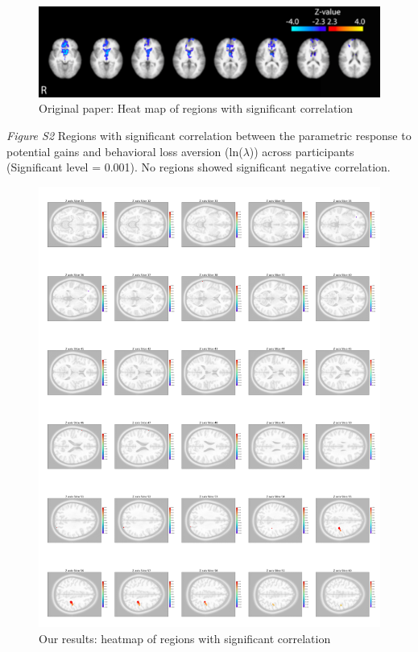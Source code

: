 \documentclass[11pt]{article}
\begin{document}
\begin{figure}[H]
    \centering
        \includegraphics[scale=0.5]{figures/Regression3/Orig_sig_cor_z_loss.png}
    \caption{Original paper: Heat map of regions with significant correlation}
\end{figure}

\newpage

\emph{Figure S2} Regions with significant correlation between the parametric 
response to potential gains and behavioral loss aversion (ln($\lambda$)) across 
participants (Significant level = 0.001).  No regions showed significant 
negative correlation.

\begin{figure}[H]\label{sig_cor_z_gain}
    \centering
        \includegraphics[scale=0.105]{figures/Regression3/sig_cor_z_gain.png}
    \caption{Our results: heatmap of regions with significant correlation}
\end{figure}
\end{document}
